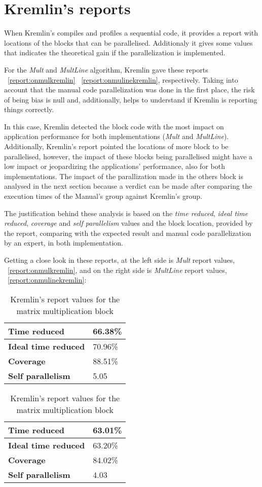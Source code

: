 \section{Kremlin's reports}

When Kremlin's compiles and profiles a sequential code, it provides a report with locations of the blocks that can be parallelised. Additionaly it gives some values that indicates the theoretical gain if the parallelization is implemented.

For the \textit{Mult} and \textit{MultLine} algorithm, Kremlin gave these reports ~\ref{report:onmulkremlin} ~\ref{report:onmulinekremlin}, respectively. Taking into account that the manual code parallelization was done in the first place, the risk of being bias is null and, additionally, helps to understand if Kremlin is reporting things correctly.

In this case, Kremlin detected the block code with the most impact on application performance for both implementations (\textit{Mult} and \textit{MultLine}). Additionally, Kremlin's report pointed the locations of more block to be parallelised, however, the impact of these blocks being parallelised might have a low impact or jeopardizing the applications' performance, also for both implementations. The impact of the parallization made in the others block is analysed in the next section because a verdict can be made after comparing the execution times of the Manual's group against Kremlin's group. 

The justification behind these analysis is based on the \textit{ time reduced}, \textit{ideal time reduced}, \textit{coverage} and \textit{self parallelism} values and the block location, provided by the report, comparing with the expected result and manual code parallelization by an expert, in both implementation.

Getting a close look in these reports, at the left side is \textit{Mult} report values, ~\ref{report:onmulkremlin}, and on the right side is \textit{MultLine} report values, ~\ref{report:onmulinekremlin}:

\begin{table}[htb]
\centering
\caption{Kremlin's report values for the matrix multiplication block}
\begin{tabular}{ |l|l| }
	\hline
	\textbf{Time reduced} & 66.38\% \\ \hline
	\textbf{Ideal time reduced} & 70.96\% \\ \hline
	\textbf{Coverage} & 88.51\% \\ \hline
	\textbf{Self parallelism} & 5.05 \\
	\hline
\end{tabular}
\quad
\begin{tabular}{ |l|l| }
	\hline
	\textbf{Time reduced} & 63.01\% \\ \hline
	\textbf{Ideal time reduced} & 63.20\% \\ \hline
	\textbf{Coverage} & 84.02\% \\ \hline
	\textbf{Self parallelism} & 4.03 \\
	\hline
\end{tabular}
\end{table}

